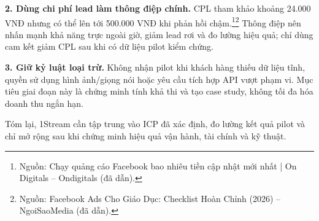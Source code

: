 \textbf{2. Dùng chi phí lead làm thông điệp chính.} CPL tham khảo khoảng 24.000 VNĐ nhưng có thể lên tới 500.000 VNĐ khi phản hồi chậm.\footnote{Nguồn: Chạy quảng cáo Facebook bao nhiêu tiền cập nhật mới nhất | On Digitals -- Ondigitals (đã dẫn).}\footnote{Nguồn: Facebook Ads Cho Giáo Dục: Checklist Hoàn Chỉnh (2026) -- NgoiSaoMedia (đã dẫn).} Thông điệp nên nhấn mạnh khả năng trực ngoài giờ, giảm lead rơi và đo lường hiệu quả; chỉ dùng cam kết giảm CPL sau khi có dữ liệu pilot kiểm chứng.

\textbf{3. Giữ kỷ luật loại trừ.} Không nhận pilot khi khách hàng thiếu dữ liệu tĩnh, quyền sử dụng hình ảnh/giọng nói hoặc yêu cầu tích hợp API vượt phạm vi. Mục tiêu giai đoạn này là chứng minh tính khả thi và tạo case study, không tối đa hóa doanh thu ngắn hạn.

Tóm lại, 1Stream cần tập trung vào ICP đã xác định, đo lường kết quả pilot và chỉ mở rộng sau khi chứng minh hiệu quả vận hành, tài chính và kỹ thuật.

